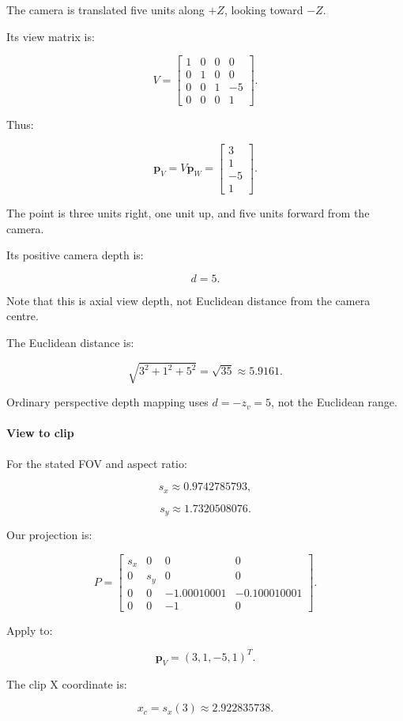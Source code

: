 The camera is translated five units along \(+Z\), looking toward \(-Z\).

Its view matrix is:

\[
 V= \begin{bmatrix} 1&0&0&0\\ 0&1&0&0\\ 0&0&1&-5\\ 0&0&0&1 \end{bmatrix}.
\]

Thus:

\[
 \boxed{ \mathbf p_V= V\mathbf p_W= \begin{bmatrix} 3\\1\\-5\\1 \end{bmatrix} }.
\]

The point is three units right, one unit up, and five units forward from the camera.

Its positive camera depth is:

\[
 \boxed{d=5}.
\]

Note that this is axial view depth, not Euclidean distance from the camera centre.

The Euclidean distance is:

\[
 \sqrt{3^2+1^2+5^2}=\sqrt{35}\approx5.9161.
\]

Ordinary perspective depth mapping uses \(d=-z_v=5\), not the Euclidean range.

\paragraph{View to clip}\label{view-to-clip}

For the stated FOV and aspect ratio:

\[
 s_x\approx0.9742785793,
\]

\[
 s_y\approx1.7320508076.
\]

Our projection is:

\[
 P= \begin{bmatrix} s_x&0&0&0\\ 0&s_y&0&0\\ 0&0&-1.00010001&-0.100010001\\ 0&0&-1&0 \end{bmatrix}.
\]

Apply to:

\[
 \mathbf p_V=(3,1,-5,1)^T.
\]

The clip X coordinate is:

\[
 x_c=s_x(3)\approx2.922835738.
\]

